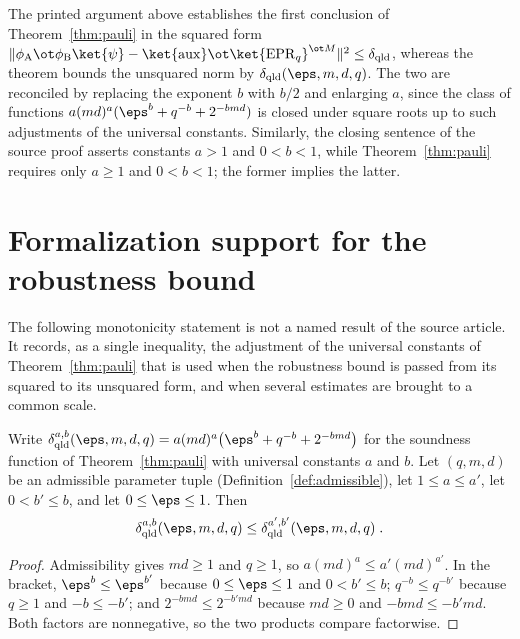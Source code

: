 \begin{remark}\label{rem:pauli-robustness-form}
	The printed argument above establishes the first conclusion of Theorem~\ref{thm:pauli} in the squared form $\| \phi_{\mathrm{A}} \ot \phi_{\mathrm{B}} \ket{\psi} - \ket{\mathrm{aux}} \ot \ket{\mathrm{EPR}_q}^{\ot M} \|^2 \leq \delta_{\mathrm{qld}}$, whereas the theorem bounds the unsquared norm by $\delta_{\mathrm{qld}}(\eps,m,d,q)$. The two are reconciled by replacing the exponent $b$ with $b/2$ and enlarging $a$, since the class of functions $a(md)^a(\eps^b + q^{-b} + 2^{-bmd})$ is closed under square roots up to such adjustments of the universal constants. Similarly, the closing sentence of the source proof asserts constants $a > 1$ and $0 < b < 1$, while Theorem~\ref{thm:pauli} requires only $a \geq 1$ and $0 < b < 1$; the former implies the latter.
\end{remark}

\section{Formalization support for the robustness bound}

The following monotonicity statement is not a named result of the source
article.  It records, as a single inequality, the adjustment of the universal
constants of Theorem~\ref{thm:pauli} that is used when the robustness bound is
passed from its squared to its unsquared form, and when several estimates are
brought to a common scale.

\begin{lemma}\label{lem:delta-qld-mono-support}
	\leanok
	Write $\delta_{\mathrm{qld}}^{a,b}(\eps,m,d,q) = a(md)^a\bigl(\eps^b + q^{-b} + 2^{-bmd}\bigr)$ for the soundness function of Theorem~\ref{thm:pauli} with universal constants $a$ and $b$. Let $(q,m,d)$ be an admissible parameter tuple (Definition~\ref{def:admissible}), let $1 \le a \le a'$, let $0 < b' \le b$, and let $0 \le \eps \le 1$. Then
	\[
		\delta_{\mathrm{qld}}^{a,b}(\eps,m,d,q) \le \delta_{\mathrm{qld}}^{a',b'}(\eps,m,d,q)\;.
	\]
\end{lemma}
\begin{proof}
	\leanok
	Admissibility gives $md \ge 1$ and $q \ge 1$, so $a(md)^a \le a'(md)^{a'}$. In the bracket, $\eps^b \le \eps^{b'}$ because $0 \le \eps \le 1$ and $0 < b' \le b$; $q^{-b} \le q^{-b'}$ because $q \ge 1$ and $-b \le -b'$; and $2^{-bmd} \le 2^{-b'md}$ because $md \ge 0$ and $-bmd \le -b'md$. Both factors are nonnegative, so the two products compare factorwise.
\end{proof}


